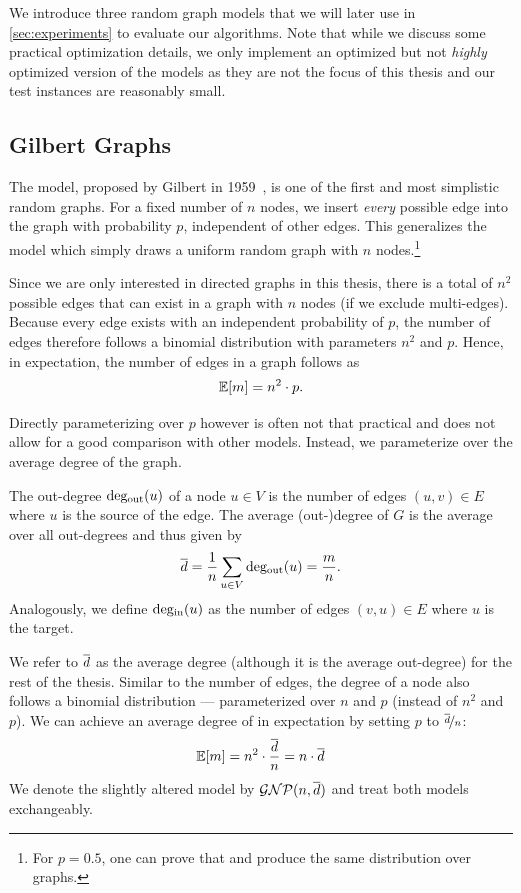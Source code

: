 We introduce three random graph models that we will later use in \cref{sec:experiments} to evaluate our algorithms.
Note that while we discuss some practical optimization details, we only implement an optimized but not \emph{highly} optimized version of the models as they are not the focus of this thesis and our test instances are reasonably small.

\subsection{Gilbert Graphs}\label{sec:gnp}
The \Gnp model, proposed by Gilbert in 1959~\cite{gilbert1959random}, is one of the first and most simplistic random graphs.
For a fixed number of $n$ nodes, we insert \emph{every} possible edge into the graph with probability $p$, independent of other edges.
This generalizes the \gn model which simply draws a uniform random graph with $n$ nodes.\footnote{For $p = 0.5$, one can prove that \Gnp and \gn produce the same distribution over graphs.}

Since we are only interested in directed graphs in this thesis, there is a total of $n^2$ possible edges that can exist in a graph with $n$ nodes (if we exclude multi-edges).
Because every edge exists with an independent probability of $p$, the number of edges therefore follows a binomial distribution with parameters $n^2$ and $p$.
Hence, in expectation, the number of edges in a \Gnp graph follows as \[
  \mathbb E\!\left[m\right] = n^2 \cdot p. 
\]

Directly parameterizing over $p$ however is often not that practical and does not allow for a good comparison with other models.
Instead, we parameterize over the average degree of the graph.

\begin{definition}[Degree] 
  The out-degree $\mathrm{deg_{out}}(u)$ of a node $u \in V$ is the number of edges $(u, v) \in E$ where $u$ is the source of the edge.
  The average (out-)degree \degavg of $G$ is the average over all out-degrees and thus given by \[
    \overline{d} = \frac{1}{n}\sum_{u \in V}\mathrm{deg_{out}}(u) = \frac{m}{n}.
  \] Analogously, we define $\mathrm{deg_{in}}(u)$ as the number of edges $(v, u) \in E$ where $u$ is the target.
\end{definition}

\noindent We refer to $\overline{d}$ as the average degree (although it is the average out-degree) for the rest of the thesis.
Similar to the number of edges, the degree of a node also follows a binomial distribution --- parameterized over $n$ and $p$ (instead of $n^2$ and $p$).
We can achieve an average degree of \degavg in expectation by setting $p$ to $\nicefrac{\overline{d}}{n}$: \[
  \mathbb E\!\left[m\right] = n^2 \cdot \frac{\overline{d}}{n} = n \cdot \overline{d} 
\]  
We denote the slightly altered model by $\mathcal{GNP}(n, \overline{d})$ and treat both models exchangeably.


